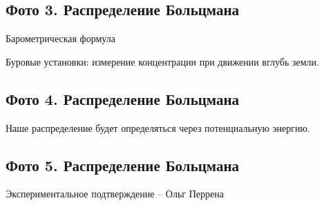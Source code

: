 \documentclass[12pt]{article}
\begin{document}
\subsection{Фото 3. Распределение Больцмана}
\par Барометрическая формула
\par Буровые установки: измерение концентрации при движении вглубь земли.
\subsection{Фото 4. Распределение Больцмана}
\par Наше распределение будет определяться через потенциальную энергию.
\subsection{Фото 5. Распределение Больцмана}
\par Экспериментальное подтверждение -- Ольг Перрена
\end{document}
